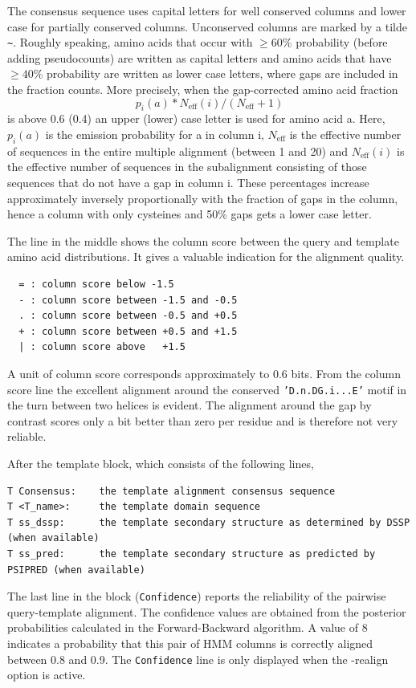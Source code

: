 \documentclass[11pt,a4paper]{article}
\begin{document}
The consensus sequence uses capital letters for well conserved columns and
lower case for partially conserved columns. Unconserved columns are marked by 
a tilde \verb`~`. Roughly speaking, amino acids that occur with $\ge 60\%$ probability 
(before adding pseudocounts) are written as capital letters and amino acids that have 
$\ge 40\%$ probability are written as lower case letters, where gaps are included
in the fraction counts. More precisely, when the gap-corrected amino acid fraction
    \[p_i(a)*N_\mathrm{eff}(i)/(N_\mathrm{eff}+1)\]
is above 0.6 (0.4) an upper (lower) case letter is used for amino acid a.
Here, $p_i(a)$ is the emission probability for a in column i, $N_\mathrm{eff}$ is the effective 
number of sequences in the entire multiple alignment (between 1 and 20) and $N_\mathrm{eff}(i)$ is 
the effective number of sequences in the subalignment consisting of those sequences
that do not have a gap in column i. These percentages increase
approximately inversely proportionally with the fraction of gaps in the column, 
hence a column with only cysteines and 50\% gaps gets a lower case letter.
              
The line in the middle shows the column score between the query and template 
amino acid distributions. It gives a valuable indication for the alignment quality.
\small
\begin{verbatim}
  = : column score below -1.5
  - : column score between -1.5 and -0.5
  . : column score between -0.5 and +0.5
  + : column score between +0.5 and +1.5
  | : column score above   +1.5
\end{verbatim}\normalsize

A unit of column score corresponds approximately to 0.6 bits.
From the column score line the excellent alignment around the conserved 
{\tt 'D.n.DG.i...E'} motif in the turn between two helices is evident. The alignment around the 
gap by contrast scores only a bit better than zero per residue and is
therefore not very reliable.

After the template block, which consists of the following lines, 
\small 
\begin{verbatim}
T Consensus:    the template alignment consensus sequence
T <T_name>:     the template domain sequence
T ss_dssp:      the template secondary structure as determined by DSSP (when available)
T ss_pred:      the template secondary structure as predicted by PSIPRED (when available)
\end{verbatim}\normalsize

The last line in the block ({\tt Confidence}) reports the reliability of the pairwise 
query-template alignment. The confidence values are obtained from the posterior 
probabilities calculated in the Forward-Backward algorithm. A value of 8 indicates
a probability that this pair of HMM columns is correctly aligned between 0.8 and 0.9. 
The {\tt Confidence} line is only displayed when the -realign option is active.
\end{document}
